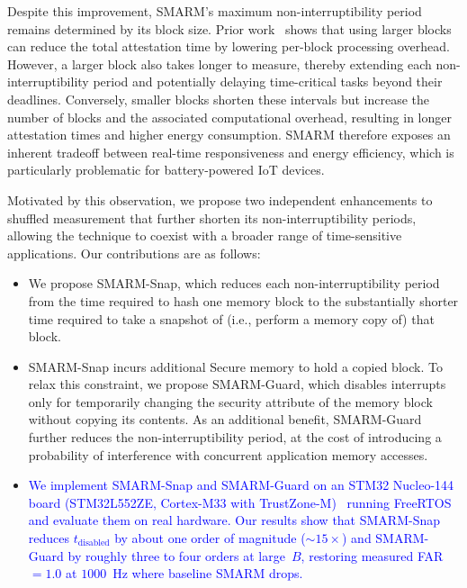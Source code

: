 \documentclass[conference]{IEEEtran}
\newcommand{\tdis}{$t_{\mathrm{disabled}}$\xspace}
\newcommand{\smarmcopy}{SMARM-Snap\xspace}
\newcommand{\smarmlock}{SMARM-Guard\xspace}
\newcommand\ben[1]{\textcolor{blue}{#1}}
\begin{document}
Despite this improvement, SMARM's maximum non-interruptibility period remains determined by its block size. Prior work~\cite{smarmplus2026,carpent2018smarm} shows that using larger blocks can reduce the total attestation time by lowering per-block processing overhead. However, a larger block also takes longer to measure, thereby extending each non-interruptibility period and potentially delaying time-critical tasks beyond their deadlines. Conversely, smaller blocks shorten these intervals but increase the number of blocks and the associated computational overhead, resulting in longer attestation times and higher energy consumption. SMARM therefore exposes an inherent tradeoff between real-time responsiveness and energy efficiency, which is particularly problematic for battery-powered IoT devices.


Motivated by this observation, we propose two independent enhancements to shuffled measurement that further shorten its non-interruptibility periods, allowing the technique to coexist with a broader range of time-sensitive applications.
Our contributions are as follows:

\begin{itemize}
\item We propose \smarmcopy, which reduces each non-interruptibility period from the time required to hash one memory block to the substantially shorter time required to take a snapshot of (i.e., perform a memory copy of) that block.

 

\item \smarmcopy incurs additional Secure memory to hold a copied block. To relax this constraint, we propose \smarmlock, which disables interrupts only for temporarily changing the security attribute of the memory block without copying its contents.
As an additional benefit, \smarmlock further reduces the non-interruptibility period, at the cost of introducing a probability of interference with concurrent application memory accesses.

\item \ben{We implement \smarmcopy and \smarmlock on an STM32 Nucleo-144 board (STM32L552ZE, Cortex-M33 with TrustZone-M)~\cite{stm32nucleo144} running FreeRTOS and evaluate them on real hardware. Our results show that \smarmcopy{} reduces \tdis{} by about one order of magnitude ($\sim\!\!15\times$) and \smarmlock{} by roughly three to four orders at large~$B$, restoring measured FAR~$=1.0$ at $1000$~Hz where baseline SMARM drops.}


\end{itemize}
\end{document}
